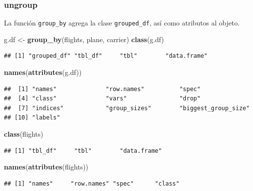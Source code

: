 \documentclass[]{article}
\newenvironment{Shaded}{\begin{snugshade}}{\end{snugshade}}
\newcommand{\KeywordTok}[1]{\textcolor[rgb]{0.13,0.29,0.53}{\textbf{#1}}}
\newcommand{\StringTok}[1]{\textcolor[rgb]{0.31,0.60,0.02}{#1}}
\newcommand{\NormalTok}[1]{#1}
\begin{document}
\subsubsection{ungroup}\label{ungroup}

La función \texttt{group\_by} agrega la clase \texttt{grouped\_df}, así
como atributos al objeto.

\begin{Shaded}
\begin{Highlighting}[]
\NormalTok{g.df <-}\StringTok{ }\KeywordTok{group_by}\NormalTok{(flights, plane, carrier)}
\KeywordTok{class}\NormalTok{(g.df)}
\end{Highlighting}
\end{Shaded}

\begin{verbatim}
## [1] "grouped_df" "tbl_df"     "tbl"        "data.frame"
\end{verbatim}

\begin{Shaded}
\begin{Highlighting}[]
\KeywordTok{names}\NormalTok{(}\KeywordTok{attributes}\NormalTok{(g.df))}
\end{Highlighting}
\end{Shaded}

\begin{verbatim}
##  [1] "names"              "row.names"          "spec"              
##  [4] "class"              "vars"               "drop"              
##  [7] "indices"            "group_sizes"        "biggest_group_size"
## [10] "labels"
\end{verbatim}

\begin{Shaded}
\begin{Highlighting}[]
\KeywordTok{class}\NormalTok{(flights)}
\end{Highlighting}
\end{Shaded}

\begin{verbatim}
## [1] "tbl_df"     "tbl"        "data.frame"
\end{verbatim}

\begin{Shaded}
\begin{Highlighting}[]
\KeywordTok{names}\NormalTok{(}\KeywordTok{attributes}\NormalTok{(flights))}
\end{Highlighting}
\end{Shaded}

\begin{verbatim}
## [1] "names"     "row.names" "spec"      "class"
\end{verbatim}
\end{document}

